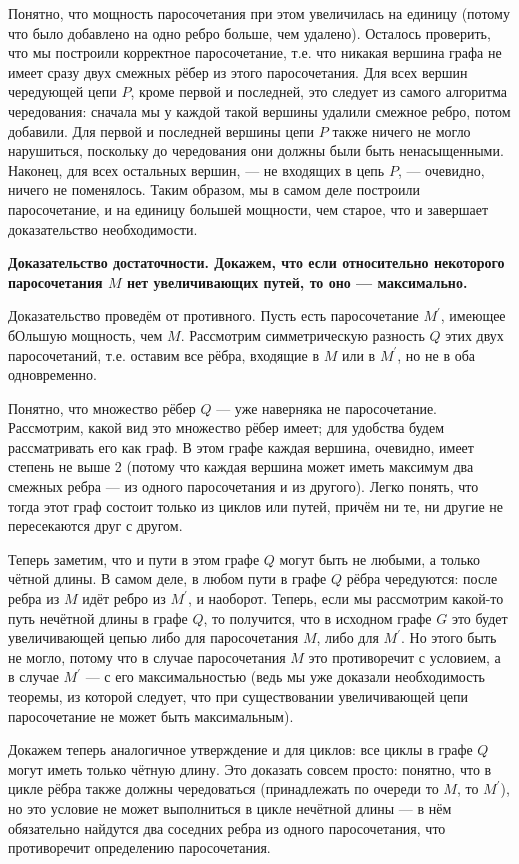 Понятно, что мощность паросочетания при этом увеличилась на единицу (потому что было добавлено на одно ребро больше, чем удалено). Осталось проверить, что мы построили корректное паросочетание, т.е. что никакая вершина графа не имеет сразу двух смежных рёбер из этого паросочетания. Для всех вершин чередующей цепи $P$, кроме первой и последней, это следует из самого алгоритма чередования: сначала мы у каждой такой вершины удалили смежное ребро, потом добавили. Для первой и последней вершины цепи $P$ также ничего не могло нарушиться, поскольку до чередования они должны были быть ненасыщенными. Наконец, для всех остальных вершин, --- не входящих в цепь $P$, --- очевидно, ничего не поменялось. Таким образом, мы в самом деле построили паросочетание, и на единицу большей мощности, чем старое, что и завершает доказательство необходимости.

\bf{Доказательство достаточности}. Докажем, что если относительно некоторого паросочетания $M$ нет увеличивающих путей, то оно --- максимально.

Доказательство проведём от противного. Пусть есть паросочетание $M^\prime$, имеющее бОльшую мощность, чем $M$. Рассмотрим симметрическую разность $Q$ этих двух паросочетаний, т.е. оставим все рёбра, входящие в $M$ или в $M^\prime$, но не в оба одновременно.

Понятно, что множество рёбер $Q$ --- уже наверняка не паросочетание. Рассмотрим, какой вид это множество рёбер имеет; для удобства будем рассматривать его как граф. В этом графе каждая вершина, очевидно, имеет степень не выше 2 (потому что каждая вершина может иметь максимум два смежных ребра --- из одного паросочетания и из другого). Легко понять, что тогда этот граф состоит только из циклов или путей, причём ни те, ни другие не пересекаются друг с другом.

Теперь заметим, что и пути в этом графе $Q$ могут быть не любыми, а только чётной длины. В самом деле, в любом пути в графе $Q$ рёбра чередуются: после ребра из $M$ идёт ребро из $M^\prime$, и наоборот. Теперь, если мы рассмотрим какой-то путь нечётной длины в графе $Q$, то получится, что в исходном графе $G$ это будет увеличивающей цепью либо для паросочетания $M$, либо для $M^\prime$. Но этого быть не могло, потому что в случае паросочетания $M$ это противоречит с условием, а в случае $M^\prime$ --- с его максимальностью (ведь мы уже доказали необходимость теоремы, из которой следует, что при существовании увеличивающей цепи паросочетание не может быть максимальным).

Докажем теперь аналогичное утверждение и для циклов: все циклы в графе $Q$ могут иметь только чётную длину. Это доказать совсем просто: понятно, что в цикле рёбра также должны чередоваться (принадлежать по очереди то $M$, то $M^\prime$), но это условие не может выполниться в цикле нечётной длины --- в нём обязательно найдутся два соседних ребра из одного паросочетания, что противоречит определению паросочетания.

